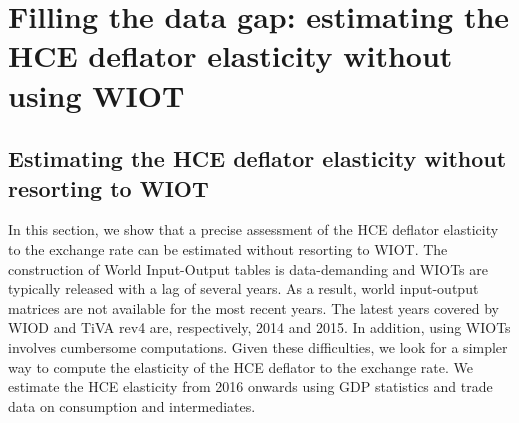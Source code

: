 \documentclass[12pt,a4paper]{paper}
\begin{document}
%
%
%
%
%

\section{Filling the data gap: estimating the HCE deflator elasticity without using WIOT}
\label{sec:extrapo}
\subsection{Estimating the HCE deflator elasticity without resorting to WIOT}
In this section, we show that a precise assessment of the HCE deflator elasticity to the exchange rate can be estimated without resorting to WIOT. 
The construction of World Input-Output tables is data-demanding and WIOTs are typically released with a lag of several years.
As a result, world input-output matrices are not available for the most recent years.
The latest years covered by WIOD and TiVA rev4 are, respectively, 2014 and 2015. 
In addition, using WIOTs involves cumbersome computations.
Given these difficulties, we look for a simpler way to compute the elasticity of the HCE deflator to the exchange rate.
We estimate the HCE elasticity from 2016 onwards using GDP statistics and trade data on consumption and intermediates.\\
\end{document}
